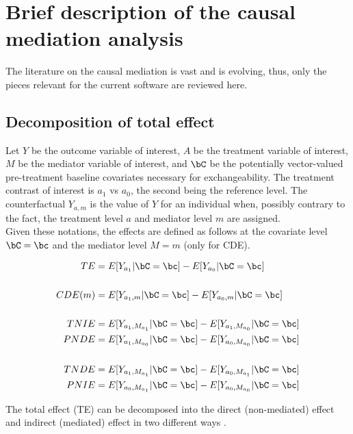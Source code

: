 \documentclass[dvipdfmx,10pt]{article}
\date{\today}
\title{}
\begin{document}
\tableofcontents

\sloppy
\newpage
\section{Brief description of the causal mediation analysis}
\label{sec:org827734e}

The literature on the causal mediation is vast \cite{vanderweeleExplanationCausalInference2015} and is evolving, thus, only the pieces relevant for the current software are reviewed here.

\subsection{Decomposition of total effect}
\label{sec:org2a5ec60}
Let \(Y\) be the outcome variable of interest, \(A\) be the treatment variable of interest, \(M\) be the mediator variable of interest, and \(\bC\) be the potentially vector-valued pre-treatment baseline covariates necessary for exchangeability. The treatment contrast of interest is \(a_{1}\) vs \(a_{0}\), the second being the reference level. The counterfactual \(Y_{a,m}\) is the value of \(Y\) for an individual when, possibly contrary to the fact, the treatment level \(a\) and mediator level \(m\) are assigned.\\

Given these notations, the effects are defined as follows at the covariate level \(\bC = \bc\) and the mediator level \(M = m\) (only for CDE).

\begin{align*}
TE &= E[Y_{a_{1}} | \bC = \bc] - E[Y_{a_{0}} | \bC = \bc]\\
\\
CDE(m) &= E[Y_{a_{1},m} | \bC = \bc] - E[Y_{a_{0},m} | \bC = \bc]\\
\\
TNIE &= E[Y_{a_{1},M_{a_{1}}} | \bC = \bc] - E[Y_{a_{1},M_{a_{0}}} | \bC = \bc]\\
PNDE &= E[Y_{a_{1},M_{a_{0}}} | \bC = \bc] - E[Y_{a_{0},M_{a_{0}}} | \bC = \bc]\\
\\
TNDE &= E[Y_{a_{1},M_{a_{1}}} | \bC = \bc] - E[Y_{a_{0},M_{a_{1}}} | \bC = \bc]\\
PNIE &= E[Y_{a_{0},M_{a_{1}}} | \bC = \bc] - E[Y_{a_{0},M_{a_{0}}} | \bC = \bc]\\
\end{align*}

The total effect (TE) can be decomposed into the direct (non-mediated) effect and indirect (mediated) effect in two different ways \cite{robinsIdentifiabilityExchangeabilityDirect1992,vanderweeleThreewayDecompositionTotal2013}.\\
\end{document}
